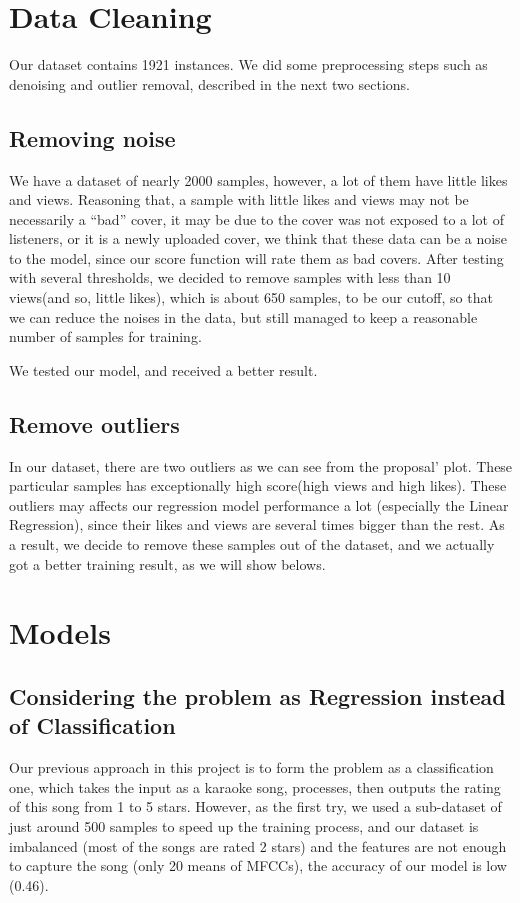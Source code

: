\documentclass[paper=a4, fontsize=11pt, DIV=13]{scrartcl}
\begin{document}
\section{Data Cleaning}

Our dataset contains 1921 instances. We did some preprocessing steps such as denoising and outlier removal, described in the next two sections. 

\subsection{Removing noise}
We have a dataset of nearly 2000 samples, however, a lot of them have little likes and views. Reasoning that, a sample with little likes and views may not be necessarily a “bad” cover, it may be due to the cover was not exposed to a lot of listeners, or it is a newly uploaded cover, we think that these data can be a noise to the model, since our score function will rate them as bad covers. After testing with several thresholds, we decided to remove samples with less than 10 views(and so, little likes), which is about 650 samples, to be our cutoff, so that we can reduce the noises in the data, but still managed to keep a reasonable number of samples for training.

We tested our model, and received a better result.

\subsection{Remove outliers}
In our dataset, there are two outliers as we can see from the proposal’ plot. These particular samples has exceptionally high score(high views and high likes). These outliers may affects our regression model performance a lot (especially the Linear Regression), since their likes and views are several times bigger than the rest. As a result, we decide to remove these samples out of the dataset, and we actually got a better training result, as we will show belows.

\section{Models}

\subsection{Considering the problem as Regression instead of Classification}
Our previous approach in this project is to form the problem as a classification one, which takes the input as a karaoke song, processes, then outputs the rating of this song from 1 to 5 stars. However, as the first try, we used a sub-dataset of just around 500 samples to speed up the training process, and our dataset is imbalanced (most of the songs are rated 2 stars) and the features are not enough to capture the song (only 20 means of MFCCs), the accuracy of our model is low (0.46).
\end{document}
